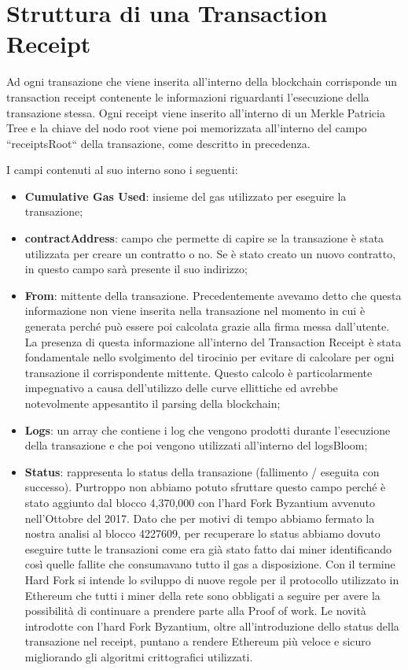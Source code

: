 \documentclass[12pt]{report}
\begin{document}
\section{Struttura di una Transaction Receipt}

Ad ogni transazione che viene inserita all'interno della blockchain corrisponde  un transaction receipt contenente le informazioni riguardanti l'esecuzione della transazione stessa.
\newline 
Ogni receipt viene inserito all'interno di un Merkle Patricia Tree e la chiave del nodo root viene poi memorizzata all'interno del campo ``receiptsRoot`` della transazione, come descritto in precedenza.

I campi contenuti al suo interno sono i seguenti:

\begin{itemize}
\item \textbf{Cumulative Gas Used}: insieme del gas utilizzato per eseguire la transazione;
\item \textbf{contractAddress}: campo che permette di capire se la transazione è stata utilizzata per creare un contratto o no. Se è stato creato un nuovo contratto, in questo campo sarà presente il suo indirizzo;
\item \textbf{From}: mittente della transazione. Precedentemente avevamo detto che questa informazione non viene inserita nella transazione nel momento in cui è generata perché può essere poi calcolata grazie alla firma messa dall'utente. La presenza di questa informazione all'interno del Transaction Receipt è stata fondamentale nello svolgimento del tirocinio per evitare di calcolare per ogni transazione il corrispondente mittente. Questo calcolo è particolarmente impegnativo a causa dell'utilizzo delle curve ellittiche ed avrebbe notevolmente appesantito il parsing della blockchain;
\item \textbf{Logs}: un array che contiene i log che vengono prodotti durante l'esecuzione della transazione e che poi vengono utilizzati all'interno del logsBloom;
\item \textbf{Status}: rappresenta lo status della transazione (fallimento / eseguita con successo).
Purtroppo non abbiamo potuto sfruttare questo campo perché è stato aggiunto dal blocco 4,370,000 con l'hard Fork Byzantium \cite{Byzantium} avvenuto nell'Ottobre del 2017.
Dato che per motivi di tempo abbiamo fermato la nostra analisi al blocco 4227609, per recuperare lo status abbiamo dovuto eseguire tutte le transazioni come era già stato fatto dai miner identificando così quelle fallite che consumavano tutto il gas a disposizione.
Con il termine Hard Fork si intende lo sviluppo di nuove regole per il protocollo utilizzato in Ethereum che tutti i miner della rete sono obbligati a seguire per avere la possibilità di continuare a prendere parte alla Proof of work.
Le novità introdotte con l'hard Fork Byzantium, oltre all'introduzione dello status della transazione nel receipt, puntano a rendere Ethereum più veloce e sicuro migliorando gli algoritmi crittografici utilizzati.

\end{itemize}
\end{document}
